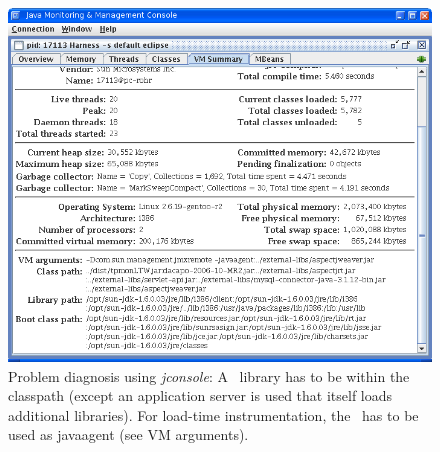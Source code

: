 \documentclass[a4paper,12pt]{scrartcl}
\begin{document}
\begin{figure}
 \centering
 \includegraphics[width=12cm]{snapshot5.png}
 \caption{Problem diagnosis using \textit{jconsole}: A \tpmon\ library has to be within the classpath (except an application server is used that itself loads additional libraries). For load-time instrumentation, the \aspectjweaverjar\ has to be used as javaagent (see VM arguments).}\label{jconsole}
\end{figure}
%
%
%
%
%


%
%

%
%





\end{document}
